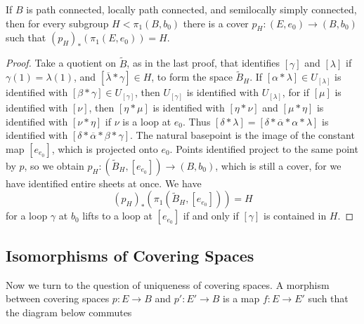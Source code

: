 \begin{theorem}
    If $B$ is path connected, locally path connected, and semilocally simply connected, then for every subgroup $H < \pi_1(B,b_0)$ there is a cover $p_H: (E,e_0) \to (B,b_0)$ such that $(p_H)_*(\pi_1(E,e_0)) = H$.
\end{theorem}
\begin{proof}
    Take a quotient on $\tilde{B}$, as in the last proof, that identifies $[\gamma]$ and $[\lambda]$ if $\gamma(1) = \lambda(1)$, and $[\overline{\lambda} * \gamma] \in H$, to form the space $\tilde{B}_H$. If $[\alpha * \lambda] \in U_{[\lambda]}$ is identified with $[\beta * \gamma] \in U_{[\gamma]}$, then $U_{[\gamma]}$ is identified with $U_{[\lambda]}$, for if $[\mu]$ is identified with $[\nu]$, then $[\eta * \mu]$ is identified with $[\eta * \nu]$ and $[\mu * \eta]$ is identified with $[\nu * \eta]$ if $\nu$ is a loop at $e_0$. Thus $[\delta * \lambda] = [\delta * \overline{\alpha} * \alpha * \lambda]$ is identified with $[\delta * \overline{\alpha} * \beta * \gamma]$. The natural basepoint is the image of the constant map $[e_{e_0}]$, which is projected onto $e_0$. Points identified project to the same point by $p$, so we obtain $p_H: (\tilde{B}_H, [e_{e_0}]) \to (B,b_0)$, which is still a cover, for we have identified entire sheets at once. We have
    \[ (p_H)_*(\pi_1(\tilde{B}_H, [e_{e_0}])) = H \]
    for a loop $\gamma$ at $b_0$ lifts to a loop at $[e_{e_0}]$ if and only if $[\gamma]$ is contained in $H$.
\end{proof}

\subsection{Isomorphisms of Covering Spaces}

Now we turn to the question of uniqueness of covering spaces. A morphism between covering spaces $p: E \to B$ and $p' : E' \to B$ is a map $f: E \to E'$ such that the diagram below commutes
%
\begin{center}
\end{center}

